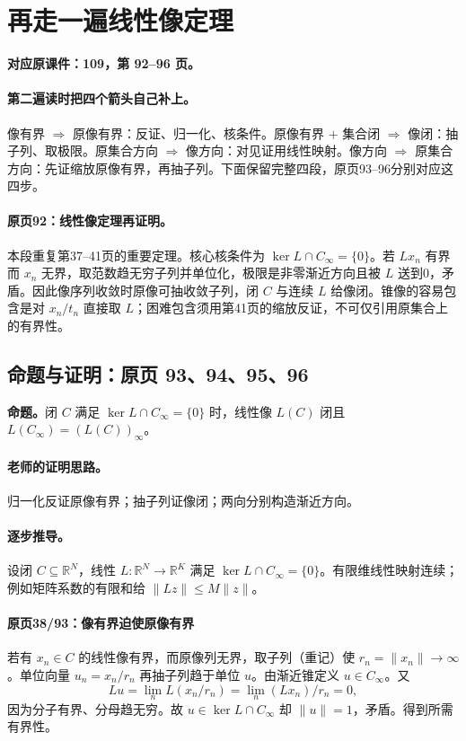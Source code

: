 \documentclass[11pt,a4paper]{article}
\newcommand{\R}{\mathbb{R}}\newcommand{\N}{\mathbb{N}}
\theoremstyle{definition}\newtheorem{definition}{定义}\newtheorem{example}{例}
\begin{document}
\clearpage\section{再走一遍线性像定理}\label{g:109:92}

\textbf{对应原课件：109，第 92--96 页。}


\paragraph{第二遍读时把四个箭头自己补上。}
像有界 $\Rightarrow$ 原像有界：反证、归一化、核条件。原像有界 $+$ 集合闭 $\Rightarrow$ 像闭：抽子列、取极限。原集合方向 $\Rightarrow$ 像方向：对见证用线性映射。像方向 $\Rightarrow$ 原集合方向：先证缩放原像有界，再抽子列。下面保留完整四段，原页93--96分别对应这四步。


\paragraph{原页92：线性像定理再证明。}本段重复第37--41页的重要定理。核心核条件为 $\ker L\cap C_\infty=\{0\}$。若 $Lx_n$ 有界而 $x_n$ 无界，取范数趋无穷子列并单位化，极限是非零渐近方向且被 $L$ 送到0，矛盾。因此像序列收敛时原像可抽收敛子列，闭 $C$ 与连续 $L$ 给像闭。锥像的容易包含是对 $x_n/t_n$ 直接取 $L$；困难包含须用第41页的缩放反证，不可仅引用原集合上的有界性。



\subsection{命题与证明：原页 93、94、95、96}

\textbf{命题。}闭 $C$ 满足 $\ker L\cap C_\infty=\{0\}$ 时，线性像 $L(C)$ 闭且 $L(C_\infty)=(L(C))_\infty$。

\paragraph{老师的证明思路。}归一化反证原像有界；抽子列证像闭；两向分别构造渐近方向。

\paragraph{逐步推导。}
设闭 $C\subseteq\R^N$，线性 $L:\R^N\to\R^K$ 满足 $\ker L\cap C_\infty=\{0\}$。有限维线性映射连续；例如矩阵系数的有限和给 $\|Lz\|\le M\|z\|$。
\paragraph{原页38/93：像有界迫使原像有界}
若有 $x_n\in C$ 的线性像有界，而原像列无界，取子列（重记）使 $r_n=\|x_n\|\to\infty$。单位向量 $u_n=x_n/r_n$ 再抽子列趋于单位 $u$。由渐近锥定义 $u\in C_\infty$。又
\[Lu=\lim_n L(x_n/r_n)=\lim_n(Lx_n)/r_n=0,\]
因为分子有界、分母趋无穷。故 $u\in\ker L\cap C_\infty$ 却 $\|u\|=1$，矛盾。得到所需有界性。
\end{document}
